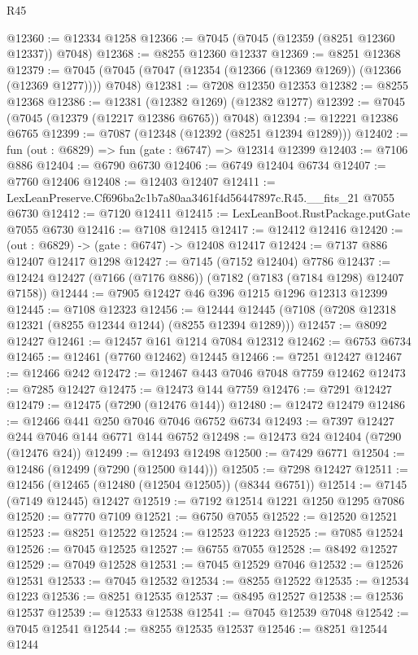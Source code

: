 \begin{lexlean}{R45}
\begin{coremodule}
{@12360 := @12334 @1258
@12366 := @7045 (@7045 (@12359 (@8251 @12360 @12337)) @7048)
@12368 := @8255 @12360 @12337
@12369 := @8251 @12368
@12379 := @7045 (@7045 (@7047 (@12354 (@12366 (@12369 @1269)) (@12366 (@12369 @1277)))) @7048)
@12381 := @7208 @12350 @12353
@12382 := @8255 @12368
@12386 := @12381 (@12382 @1269) (@12382 @1277)
@12392 := @7045 (@7045 (@12379 (@12217 @12386 @6765)) @7048)
@12394 := @12221 @12386 @6765
@12399 := @7087 (@12348 (@12392 (@8251 @12394 @1289)))
@12402 := fun (out : @6829) => fun (gate : @6747) => @12314 @12399
@12403 := @7106 @886
@12404 := @6790 @6730
@12406 := @6749 @12404 @6734
@12407 := @7760 @12406
@12408 := @12403 @12407
@12411 := LexLeanPreserve.Cf696ba2c1b7a80aa3461f4d56447897c.R45.__fits_21 @7055 @6730
@12412 := @7120 @12411
@12415 := LexLeanBoot.RustPackage.putGate @7055 @6730
@12416 := @7108 @12415
@12417 := @12412 @12416
@12420 := (out : @6829) -> (gate : @6747) -> @12408 @12417
@12424 := @7137 @886 @12407 @12417 @1298
@12427 := @7145 (@7152 @12404) @7786
@12437 := @12424 @12427 (@7166 (@7176 @886)) (@7182 (@7183 (@7184 @1298) @12407 @7158))
@12444 := @7905 @12427 @46 @396 @1215 @1296 @12313 @12399
@12445 := @7108 @12323
@12456 := @12444 @12445 (@7108 (@7208 @12318 @12321 (@8255 @12344 @1244) (@8255 @12394 @1289)))
@12457 := @8092 @12427
@12461 := @12457 @161 @1214 @7084 @12312
@12462 := @6753 @6734
@12465 := @12461 (@7760 @12462) @12445
@12466 := @7251 @12427
@12467 := @12466 @242
@12472 := @12467 @443 @7046 @7048 @7759 @12462
@12473 := @7285 @12427
@12475 := @12473 @144 @7759
@12476 := @7291 @12427
@12479 := @12475 (@7290 (@12476 @144))
@12480 := @12472 @12479
@12486 := @12466 @441 @250 @7046 @7046 @6752 @6734
@12493 := @7397 @12427 @244 @7046 @144 @6771 @144 @6752
@12498 := @12473 @24 @12404 (@7290 (@12476 @24))
@12499 := @12493 @12498
@12500 := @7429 @6771
@12504 := @12486 (@12499 (@7290 (@12500 @144)))
@12505 := @7298 @12427
@12511 := @12456 (@12465 (@12480 (@12504 @12505)) (@8344 @6751))
@12514 := @7145 (@7149 @12445) @12427
@12519 := @7192 @12514 @1221 @1250 @1295 @7086
@12520 := @7770 @7109
@12521 := @6750 @7055
@12522 := @12520 @12521
@12523 := @8251 @12522
@12524 := @12523 @1223
@12525 := @7085 @12524
@12526 := @7045 @12525
@12527 := @6755 @7055
@12528 := @8492 @12527
@12529 := @7049 @12528
@12531 := @7045 @12529 @7046
@12532 := @12526 @12531
@12533 := @7045 @12532
@12534 := @8255 @12522
@12535 := @12534 @1223
@12536 := @8251 @12535
@12537 := @8495 @12527
@12538 := @12536 @12537
@12539 := @12533 @12538
@12541 := @7045 @12539 @7048
@12542 := @7045 @12541
@12544 := @8255 @12535 @12537
@12546 := @8251 @12544 @1244
}
\end{coremodule}
\end{lexlean}
